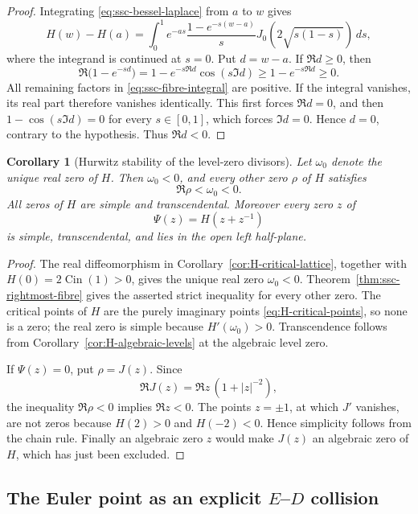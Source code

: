 \documentclass[11pt]{article}
\newtheorem{corollary}[theorem]{Corollary}
\theoremstyle{definition}
\theoremstyle{remark}
\newcommand{\Cin}{\operatorname{Cin}}
\begin{document}
\begin{proof}
Integrating \eqref{eq:ssc-bessel-laplace} from \(a\) to \(w\) gives
\begin{equation}\label{eq:ssc-fibre-integral}
 H(w)-H(a)=\int_0^1 e^{-as}
 \frac{1-e^{-s(w-a)}}{s}
 J_0\!\left(2\sqrt{s(1-s)}\right)\,ds,
\end{equation}
where the integrand is continued at \(s=0\).  Put \(d=w-a\).  If
\(\Re d\geq0\), then
\[
 \Re\bigl(1-e^{-sd}\bigr)
 =1-e^{-s\Re d}\cos(s\Im d)
 \geq1-e^{-s\Re d}\geq0.
\]
All remaining factors in \eqref{eq:ssc-fibre-integral} are positive.
If the integral vanishes, its real part therefore vanishes identically.
This first forces \(\Re d=0\), and then
\(1-\cos(s\Im d)=0\) for every \(s\in[0,1]\), which forces
\(\Im d=0\).  Hence \(d=0\), contrary to the hypothesis.  Thus
\(\Re d<0\).
\end{proof}

\begin{corollary}[Hurwitz stability of the level-zero divisors]
\label{cor:ssc-hurwitz-stability}
Let \(\omega_0\) denote the unique real zero of \(H\).  Then
\(\omega_0<0\), and every other zero \(\rho\) of \(H\) satisfies
\[
 \Re\rho<\omega_0<0.
\]
All zeros of \(H\) are simple and transcendental.  Moreover every zero
\(z\) of
\[
 \Psi(z)=H(z+z^{-1})
\]
is simple, transcendental, and lies in the open left half-plane.
\end{corollary}

\begin{proof}
The real diffeomorphism in Corollary~\ref{cor:H-critical-lattice}, together
with \(H(0)=2\Cin(1)>0\), gives the unique real zero \(\omega_0<0\).
Theorem~\ref{thm:ssc-rightmost-fibre} gives the asserted strict inequality
for every other zero.  The critical points of \(H\) are the purely
imaginary points \eqref{eq:H-critical-points}, so none is a zero; the real
zero is simple because \(H'(\omega_0)>0\).  Transcendence follows from
Corollary~\ref{cor:H-algebraic-levels} at the algebraic level zero.

If \(\Psi(z)=0\), put \(\rho=J(z)\).  Since
\[
 \Re J(z)=\Re z\,(1+|z|^{-2}),
\]
the inequality \(\Re\rho<0\) implies \(\Re z<0\).  The points
\(z=\pm1\), at which \(J'\) vanishes, are not zeros because
\(H(2)>0\) and \(H(-2)<0\).  Hence simplicity follows from the chain
rule.  Finally an algebraic zero \(z\) would make \(J(z)\) an algebraic
zero of \(H\), which has just been excluded.
\end{proof}

\subsection{The Euler point as an explicit
\texorpdfstring{$E$--$D$}{E--D} collision}
\end{document}

